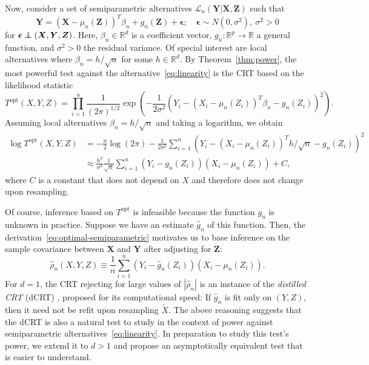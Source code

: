 \documentclass[12pt]{article}
\theoremstyle{definition}
\theoremstyle{remark}
\def\independenT#1#2{\mathrel{\rlap{$#1#2$}\mkern2mu{#1#2}}}
\newcommand\independent{\protect\mathpalette{\protect\independenT}{\perp}}
\newcommand{\prx}{\bm X}
\newcommand{\srx}{X}
\newcommand{\prz}{\bm Z}
\newcommand{\srz}{Z}
\newcommand{\pry}{{\bm Y}}
\newcommand{\sry}{Y}
\newcommand{\peps}{\bm \epsilon}
\begin{document}
Now, consider a set of semiparametric alternatives $\mathcal L_n(\pry|\prx,\prz)$ such that
\begin{equation}
	\pry = (\prx-\mu_n(\prz))^T \beta_n + g_n(\prz) + \peps; \quad \peps \sim N(0, \sigma^2 ),\ \sigma^2 > 0
	\label{eq:linearity}
\end{equation}
for $\peps \independent (\prx, \pry, \prz)$. Here, $\beta_n \in \mathbb R^d$ is a coefficient vector, $g_n: \mathbb R^p \rightarrow \mathbb R$ a general function, and $\sigma^2 > 0$ the residual variance. Of special interest are local alternatives where $\beta_n = h/\sqrt{n}$ for some $h \in \mathbb R^d$. By Theorem~\ref{thm:power}, the most powerful test against the alternative~\eqref{eq:linearity} is the CRT based on the likelihood statistic 
\begin{equation}
T^{\text{opt}}(\srx, \sry, \srz) = \prod_{i = 1}^n\frac{1}{(2\pi)^{1/2}}\exp\left(-\frac{1}{2\sigma^2}\left(\sry_i - (\srx_i-\mu_n(\srz_i))^T \beta_n - g_n(\srz_i)\right)^2\right).
\end{equation}
Assuming local alternatives $\beta_n = h/\sqrt n$ and taking a logarithm, we obtain
\begin{equation}
	\begin{split}
		\log T^{\text{opt}}(\srx, \sry, \srz) &= -\frac n 2 \log(2\pi) - \frac{1}{2\sigma^2}\sum_{i = 1}^n\left(\sry_i - (\srx_i-\mu_n(\srz_i))^T h/\sqrt{n} - g_n(\srz_i)\right)^2 \\
		&\approx   \frac{h^T}{\sigma^2}\frac{1}{\sqrt{n}}\sum_{i = 1}^n(\sry_i - g_n(\srz_i))(\srx_i-\mu_n(\srz_i)) + C,
	\end{split}
\label{eq:optimal-semiparametric}
\end{equation}
where $C$ is a constant that does not depend on $\srx$ and therefore does not change upon resampling. 

Of course, inference based on $T^{\text{opt}}$ is infeasible because the function $g_n$ is unknown in practice. Suppose we have an estimate $\widehat g_n$ of this function. Then, the derivation~\eqref{eq:optimal-semiparametric} motivates us to base inference on the sample covariance between $\prx$ and $\pry$ after adjusting for $\prz$:
\begin{equation}
	\widehat \rho_n(\srx, \sry, \srz) \equiv \frac1n\sum_{i = 1}^n (\sry_{i} - \widehat g_n(\srz_{i}))(\srx_{i} - \mu_n(\srz_i)).
	\label{rho-hat}
\end{equation}
For $d = 1$, the CRT rejecting for large values of $|\widehat \rho_n|$ is an instance of the \textit{distilled CRT}  (dCRT) \cite{Liu2020}, proposed for its computational speed: If $\widehat g_n$ is fit only on $(\sry, \srz)$, then it need not be refit upon resampling $\widetilde X$. The above reasoning suggests that the dCRT is also a natural test to study in the context of power against semiparametric alternatives~\eqref{eq:linearity}. In preparation to study this test's power, we extend it to $d > 1$ and propose an asymptotically equivalent test that is easier to understand.
\end{document}
